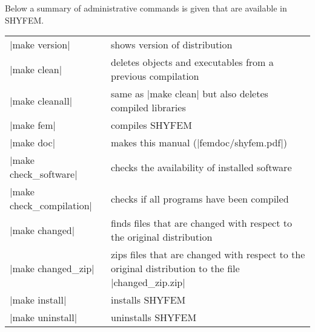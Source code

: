 
%
%
%
%
%
%
%

Below a summary of administrative commands is given that are
available in SHYFEM. \vspace{0.5cm}

\begin{center}
\begin{tabular}{ l p{7cm} }
|make version|		&	shows version of distribution \\
|make clean|		&	deletes objects and executables from a previous
                        	compilation \\
|make cleanall|		&	same as |make clean| but also deletes 
				compiled libraries \\
|make fem|		&	compiles SHYFEM \\
|make doc|		&	makes this manual (|femdoc/shyfem.pdf|) \\
|make check_software|	&	checks the availability of installed software \\
|make check_compilation|&	checks if all programs have been compiled \\
|make changed|		&	finds files that are changed with respect to the
				original distribution \\
|make changed_zip|	&	zips files that are changed with respect to the
				original distribution to the file 
				|changed_zip.zip| \\
|make install|		&	installs SHYFEM \\
|make uninstall|	&	uninstalls SHYFEM \\
\end{tabular}
\end{center}

